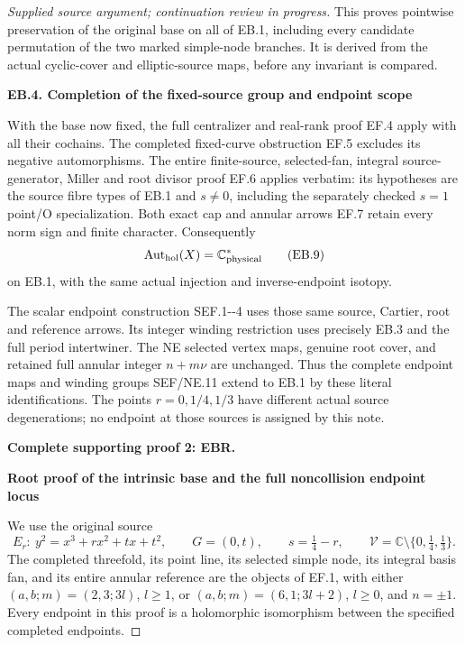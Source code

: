 \begin{proof}[Supplied source argument; continuation review in progress]
This proves pointwise preservation of the original base on all of
EB.1, including every candidate permutation of the two marked
simple-node branches. It is derived from the actual cyclic-cover
and elliptic-source maps, before any invariant is compared.

\par

\medskip\noindent\textbf{EB.4. Completion of the fixed-source group and endpoint scope}

\par\nobreak

With the base now fixed, the full centralizer and real-rank proof
EF.4 apply with all their cochains. The completed fixed-curve
obstruction EF.5 excludes its negative automorphisms. The entire
finite-source, selected-fan, integral source-generator, Miller and
root divisor proof EF.6 applies verbatim: its hypotheses are the
source fibre types of EB.1 and \(s\ne0\), including the separately
checked \(s=1\) point/O specialization. Both exact cap and annular
arrows EF.7 retain every norm sign and finite character.
Consequently
\[
              \operatorname{Aut}_{\rm hol}(X)
                    =\mathbb C^*_{\rm physical}
 \tag{EB.9}
\]
on EB.1, with the same actual injection and inverse-endpoint isotopy.

The scalar endpoint construction SEF.1-\/-4 uses those same source,
Cartier, root and reference arrows. Its integer winding restriction
uses precisely EB.3 and the full period intertwiner. The NE
selected vertex maps, genuine root cover, and retained full
annular integer \(n+m\nu\) are unchanged. Thus the complete
endpoint maps and winding groups SEF/NE.11 extend to EB.1 by these
literal identifications. The points \(r=0,1/4,1/3\) have different
actual source degenerations; no endpoint at those sources is
assigned by this note.



\par\bigskip\noindent\textbf{Complete supporting proof 2: EBR.}\par


\par

\medskip\noindent\textbf{Root proof of the intrinsic base and the full noncollision endpoint locus}

\par\nobreak

We use the original source
\[
 E_r:\ y^2=x^3+rx^2+tx+t^2,\qquad G=(0,t),\qquad
 s=\tfrac14-r,\qquad
 \mathcal V=\mathbb C\setminus\{0,\tfrac14,\tfrac13\}.
 \tag{EBR.1}
\]
The completed threefold, its point line, its selected simple node,
its integral basis fan, and its entire annular reference are the
objects of EF.1, with either
\((a,b;m)=(2,3;3l)\), \(l\geq1\), or
\((a,b;m)=(6,1;3l+2)\), \(l\geq0\), and \(n=\pm1\).
Every endpoint in this proof is a holomorphic isomorphism between
the specified completed endpoints.


\end{proof}
